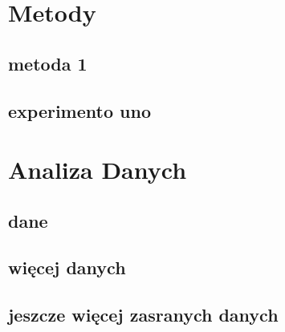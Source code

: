 \documentclass[12pt, a4paper]{article}
\begin{document}


\section{Metody}
\subsection{metoda 1}
\lipsum[2]
\subsection{experimento uno}
\lipsum[3-5]

\section{Analiza Danych}
\subsection{dane}
\lipsum[2-4]
\subsection{więcej danych}
\lipsum[2-4]
\subsection{jeszcze więcej zasranych danych}
\lipsum[2-4]



\end{document}
